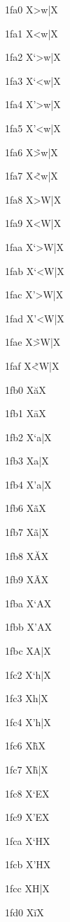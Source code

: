 \documentclass[11pt]{article}
\begin{document}
1fa0 X{\textgreek{>w|}}X

1fa1 X{\textgreek{<w|}}X

1fa2 X{\textgreek{`>w|}}X

1fa3 X{\textgreek{`<w|}}X

1fa4 X{\textgreek{'>w|}}X

1fa5 X{\textgreek{'<w|}}X

1fa6 X{\textgreek{\~{>w}|}}X

1fa7 X{\textgreek{\~{<w}|}}X

1fa8 X{\textgreek{>W|}}X

1fa9 X{\textgreek{<W|}}X

1faa X{\textgreek{`>W|}}X

1fab X{\textgreek{`<W|}}X

1fac X{\textgreek{'>W|}}X

1fad X{\textgreek{'<W|}}X

1fae X{\textgreek{\~{>W}|}}X

1faf X{\textgreek{\~{<W}|}}X

1fb0 X{\textgreek{\u{a}}}X

1fb1 X{\textgreek{\={a}}}X

1fb2 X{\textgreek{`a|}}X

1fb3 X{\textgreek{a|}}X

1fb4 X{\textgreek{'a|}}X

1fb6 X{\textgreek{\~{a}}}X

1fb7 X{\textgreek{\~{a}|}}X

1fb8 X{\textgreek{\u{A}}}X

1fb9 X{\textgreek{\={A}}}X

1fba X{\textgreek{`A}}X

1fbb X{\textgreek{'A}}X

1fbc X{\textgreek{A|}}X

1fc2 X{\textgreek{`h|}}X

1fc3 X{\textgreek{h|}}X

1fc4 X{\textgreek{'h|}}X

1fc6 X{\textgreek{\~{h}}}X

1fc7 X{\textgreek{\~{h}|}}X

1fc8 X{\textgreek{`E}}X

1fc9 X{\textgreek{'E}}X

1fca X{\textgreek{`H}}X

1fcb X{\textgreek{'H}}X

1fcc X{\textgreek{H|}}X

1fd0 X{\textgreek{\u{i}}}X
\end{document}

